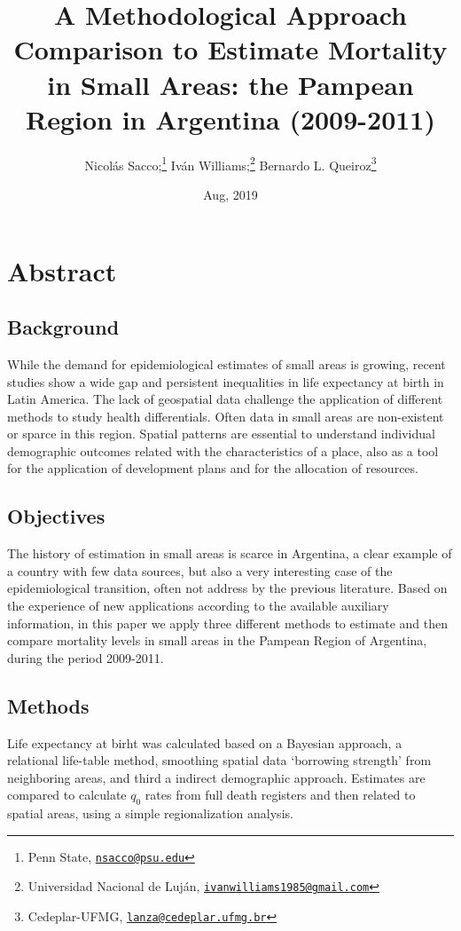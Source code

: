 \documentclass[12pt,]{article}
\title{A Methodological Approach Comparison to Estimate Mortality in Small
Areas: the Pampean Region in Argentina (2009-2011)}
\author{Nicolás Sacco;\footnote{Penn State,
  \href{mailto:nsacco@psu.edu}{\nolinkurl{nsacco@psu.edu}}} Iván
Williams;\footnote{Universidad Nacional de Luján,
  \href{mailto:ivanwilliams1985@gmail.com}{\nolinkurl{ivanwilliams1985@gmail.com}}}
Bernardo L. Queiroz\footnote{Cedeplar-UFMG,
  \href{mailto:lanza@cedeplar.ufmg.br}{\nolinkurl{lanza@cedeplar.ufmg.br}}}}
\date{Aug, 2019}
\begin{document}
\maketitle

\hypertarget{abstract}{%
\section{\texorpdfstring{\textbf{Abstract}}{Abstract}}\label{abstract}}

\hypertarget{background}{%
\subsection{\texorpdfstring{\textbf{Background}}{Background}}\label{background}}

While the demand for epidemiological estimates of small areas is
growing, recent studies show a wide gap and persistent inequalities in
life expectancy at birth in Latin America. The lack of geospatial data
challenge the application of different methods to study health
differentials. Often data in small areas are non-existent or sparce in
this region. Spatial patterns are essential to understand individual
demographic outcomes related with the characteristics of a place, also
as a tool for the application of development plans and for the
allocation of resources.

\hypertarget{objectives}{%
\subsection{\texorpdfstring{\textbf{Objectives}}{Objectives}}\label{objectives}}

The history of estimation in small areas is scarce in Argentina, a clear
example of a country with few data sources, but also a very interesting
case of the epidemiological transition, often not address by the
previous literature. Based on the experience of new applications
according to the available auxiliary information, in this paper we apply
three different methods to estimate and then compare mortality levels in
small areas in the Pampean Region of Argentina, during the period
2009-2011.

\hypertarget{methods}{%
\subsection{\texorpdfstring{\textbf{Methods}}{Methods}}\label{methods}}

Life expectancy at birht was calculated based on a Bayesian approach, a
relational life-table method, smoothing spatial data `borrowing
strength' from neighboring areas, and third a indirect demographic
approach. Estimates are compared to calculate \(q_0\) rates from full
death registers and then related to spatial areas, using a simple
regionalization analysis.
\end{document}

